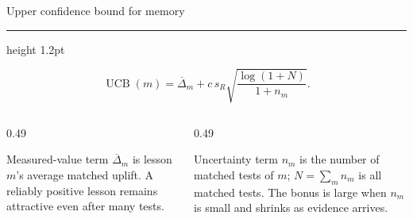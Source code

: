 \documentclass[aspectratio=169]{beamer}
\newcommand{\titlerule}{{\color{titledred}\hrule height 1.2pt}}
\begin{document}
\begin{frame}{Upper confidence bound for memory}
\titlerule
\vspace{0.45em}

\begin{block}{}
\[
\operatorname{UCB}(m)=
{\overline\Delta_m}
+
{c\,s_R
\sqrt{\frac{\log(1+N)}{1+n_m}}}.
\]
\end{block}

\begin{columns}[T,onlytextwidth]
\begin{column}{0.49\textwidth}
\begin{block}{Measured-value term}
$\overline\Delta_m$ is lesson $m$'s average matched uplift. A reliably positive
lesson remains attractive even after many tests.
\end{block}
\end{column}
\begin{column}{0.49\textwidth}
\begin{block}{Uncertainty term}
$n_m$ is the number of matched tests of $m$; $N=\sum_m n_m$ is all matched
tests. The bonus is large when $n_m$ is small and shrinks as evidence arrives.
\end{block}
\end{column}
\end{columns}

\end{frame}



\end{document}
